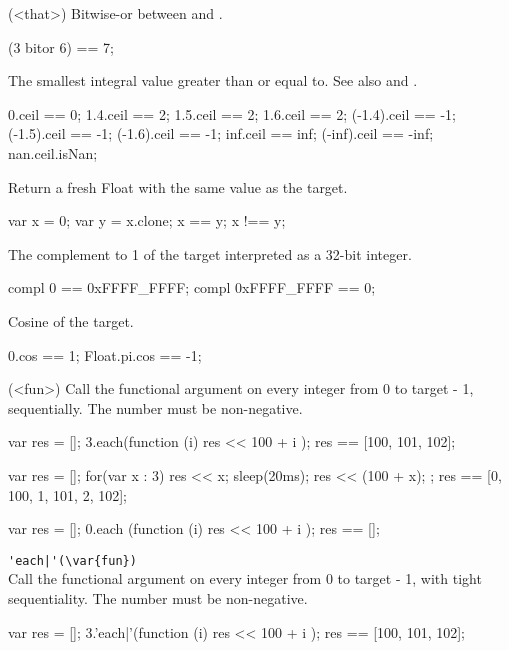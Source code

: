 \begin{urbiscriptapi}
\item['bitor'](<that>)%
  Bitwise-or between \this and .
\begin{urbiassert}
(3 bitor 6) == 7;
\end{urbiassert}

\item[ceil] The smallest integral value greater than or equal to.  See also
   and .
\begin{urbiassert}
     0.ceil ==  0;
   1.4.ceil ==  2;     1.5.ceil ==  2;    1.6.ceil ==  2;
(-1.4).ceil == -1;  (-1.5).ceil == -1; (-1.6).ceil == -1;
   inf.ceil == inf; (-inf).ceil == -inf;
   nan.ceil.isNan;
\end{urbiassert}

\item[clone]
  Return a fresh Float with the same value as the target.
\begin{urbiassert}
var x = 0;
var y = x.clone;
x == y;  x !== y;
\end{urbiassert}

\item['compl']
  The complement to 1 of the target interpreted as a 32-bit integer.
\begin{urbiassert}
compl 0 == 0xFFFF_FFFF;    compl 0xFFFF_FFFF == 0;
\end{urbiassert}

\item[cos]
  Cosine of the target.
\begin{urbiassert}
0.cos == 1;   Float.pi.cos == -1;
\end{urbiassert}

\item[each](<fun>)%
  Call the functional argument  on every integer from 0 to
  target - 1, sequentially.  The number must be non-negative.
\begin{urbiassert}
{
  var res = [];
  3.each(function (i) { res << 100 + i });
  res
}
== [100, 101, 102];

{
  var res = [];
  for(var x : 3) { res << x; sleep(20ms); res << (100 + x); };
  res
}
== [0, 100, 1, 101, 2, 102];

{
  var res = [];
  0.each (function (i) { res << 100 + i });
  res
}
== [];
\end{urbiassert}

\item \lstinline='each|'(\var{fun})=\\%
  Call the functional argument  on every integer from 0 to
  target - 1, with tight sequentiality.  The number must be
  non-negative.
\begin{urbiassert}
{
  var res = [];
  3.'each|'(function (i) { res << 100 + i });
  res
}
== [100, 101, 102];


\end{urbiassert}
\end{urbiscriptapi}
